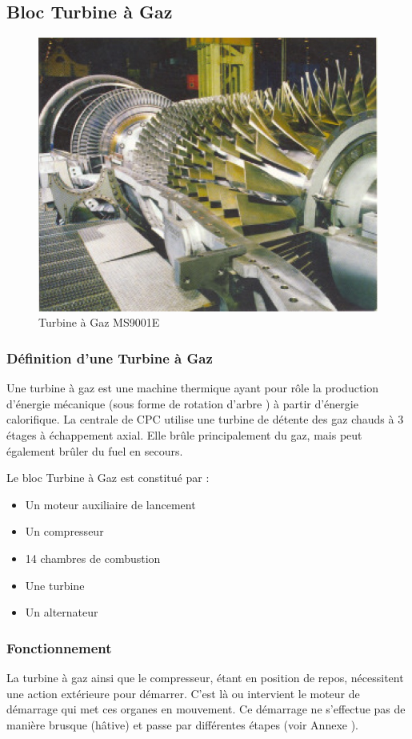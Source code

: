 \subsection{Bloc Turbine à Gaz}
\begin{figure}[hbtp]
\centering
\includegraphics[scale=1]{./Figures/tg.jpg}
\caption{Turbine à Gaz MS9001E}
\end{figure}
\subsubsection{Définition d'une Turbine à Gaz }
Une turbine à gaz est une machine thermique ayant pour rôle la production d'énergie mécanique (sous forme de rotation d'arbre ) à partir d'énergie calorifique. La centrale de CPC utilise une turbine de détente des gaz chauds à 3 étages à échappement axial. Elle brûle principalement du gaz, mais peut également brûler du fuel en secours.

Le bloc Turbine à Gaz est constitué par :

\begin{itemize}
\item Un moteur auxiliaire de lancement
\item Un compresseur
\item 14 chambres de combustion
\item Une turbine
\item Un alternateur
\end{itemize}


\subsubsection{Fonctionnement}
La turbine à gaz ainsi que le compresseur, étant en position de repos, nécessitent une action extérieure pour démarrer.
C'est là ou intervient le moteur de démarrage qui met ces organes en mouvement.
Ce démarrage ne s'effectue pas de manière brusque (hâtive) et passe par différentes étapes (voir Annexe \uppercase\expandafter{}).
   

